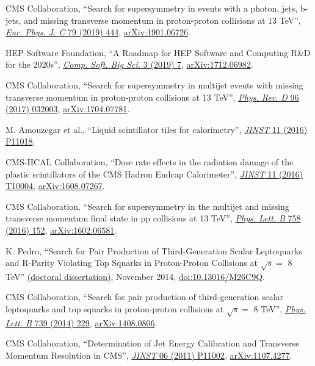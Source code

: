 \begin{description}[leftmargin=12pt,font=\normalfont,labelsep=0em]
\item CMS Collaboration, ``Search for supersymmetry in events with a photon, jets, b-jets, and missing transverse momentum in proton-proton collisions at 13 TeV'', \href{http://dx.doi.org/10.1140/epjc/s10052-019-6926-x}{\emph{Eur. Phys. J. C} 79 (2019) 444}, \href{https://arxiv.org/abs/1901.06726}{arXiv:1901.06726}. %
\item HEP Software Foundation, ``A Roadmap for HEP Software and Computing R\&D for the 2020s'', \href{https://doi.org/10.1007/s41781-018-0018-8}{\emph{Comp. Soft. Big Sci.} 3 (2019) 7}, \href{https://arxiv.org/abs/1712.06982}{arXiv:1712.06982}. %
\item CMS Collaboration, ``Search for supersymmetry in multijet events with missing transverse momentum in proton-proton collisions at 13 TeV'', \href{http://dx.doi.org/10.1103/PhysRevD.96.032003}{\emph{Phys. Rev. D} 96 (2017) 032003}, \href{http://arxiv.org/abs/1704.07781}{arXiv:1704.07781}. %
\item M. Amouzegar et al., ``Liquid scintillator tiles for calorimetry'', \href{http://dx.doi.org/10.1088/1748-0221/11/11/P11018}{\emph{JINST} 11 (2016) P11018}. %
\item CMS-HCAL Collaboration, ``Dose rate effects in the radiation damage of the plastic scintillators of the CMS Hadron Endcap Calorimeter'', \href{http://dx.doi.org/10.1088/1748-0221/11/10/T10004}{\emph{JINST} 11 (2016) T10004}, \href{http://arxiv.org/abs/1608.07267}{arXiv:1608.07267}. %
\item CMS Collaboration, ``Search for supersymmetry in the multijet and missing transverse momentum final state in pp collisions at 13 TeV'', \href{http://dx.doi.org/10.1016/j.physletb.2016.05.002}{\emph{Phys. Lett. B} 758 (2016) 152}, \href{http://arxiv.org/abs/1602.06581}{arXiv:1602.06581}. %
\item K. Pedro, ``Search for Pair Production of Third-Generation Scalar Leptoquarks and R-Parity Violating Top Squarks in Proton-Proton Collisions at $\sqrt{s} =$ 8 TeV'' \href{http://cds.cern.ch/record/1968611}{(doctoral dissertation)}, November 2014, \href{https://doi.org/10.13016/M26C9Q}{doi:10.13016/M26C9Q}. %
\item CMS Collaboration, ``Search for pair production of third-generation scalar leptoquarks and top squarks in proton-proton collisions at $\sqrt{s} =$ 8 TeV'', \href{http://dx.doi.org/10.1016/j.physletb.2014.10.063}{\emph{Phys. Lett. B} 739 (2014) 229}, \href{http://arxiv.org/abs/1408.0806}{arXiv:1408.0806}. %
\item CMS Collaboration, ``Determination of Jet Energy Calibration and Transverse Momentum Resolution in CMS'', \href{http://dx.doi.org/10.1088/1748-0221/6/11/P11002}{\emph{JINST} 06 (2011) P11002}, \href{http://arxiv.org/abs/1107.4277}{arXiv:1107.4277}. %
\end{description}


